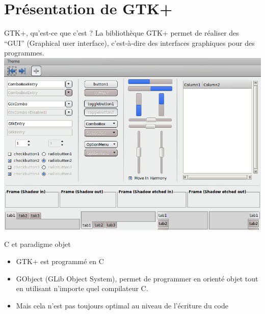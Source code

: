 \documentclass{beamer}
\begin{document}
\section{Présentation de GTK+}
\begin{frame}{GTK+, qu'est-ce que c'est ?}
	La bibliothèque GTK+ permet de réaliser des “GUI” (Graphical user interface), c’est-à-dire des interfaces graphiques pour des programmes. \includegraphics[scale=0.27]{Pictures/GTKExemple.png}
\end{frame}


\begin{frame}{C et paradigme objet}
	\begin{itemize}
    \item GTK+ est programmé en C 
	\item GObject (GLib Object System), permet de programmer en orienté objet tout en utilisant n'importe quel compilateur C. \pause
    \item Mais cela n'est pas toujours optimal au niveau de l'écriture du code
	\end{itemize}
\end{frame}
\end{document}
